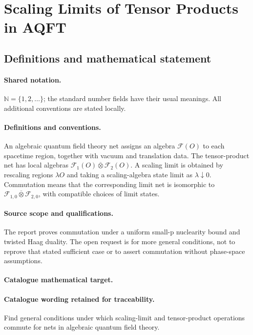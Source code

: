 \documentclass[11pt]{article}
\begin{document}
\section{Scaling Limits of Tensor Products in AQFT}\label{statement}

\subsection{Definitions and mathematical statement}

\paragraph{Shared notation.}$\mathbb N=\{1,2,\ldots\}$; the standard number fields have their usual meanings. All additional conventions are stated locally.


\paragraph{Definitions and conventions.} An algebraic quantum field theory net assigns an algebra $\mathcal F(O)$ to each spacetime region, together with vacuum and translation data. The tensor-product net has local algebras $\mathcal F_1(O)\overline\otimes\mathcal F_2(O)$. A scaling limit is obtained by rescaling regions $\lambda O$ and taking a scaling-algebra state limit as $\lambda\downarrow0$. Commutation means that the corresponding limit net is isomorphic to $\mathcal F_{1,0}\overline\otimes\mathcal F_{2,0}$, with compatible choices of limit states.

\paragraph{Source scope and qualifications.} The report proves commutation under a uniform small-p nuclearity bound and twisted Haag duality. The open request is for more general conditions, not to reprove that stated sufficient case or to assert commutation without phase-space assumptions.

\paragraph{Catalogue mathematical target.}
\paragraph{Catalogue wording retained for traceability.}
Find general conditions under which scaling-limit and tensor-product operations commute for nets in algebraic quantum field theory.
\end{document}
